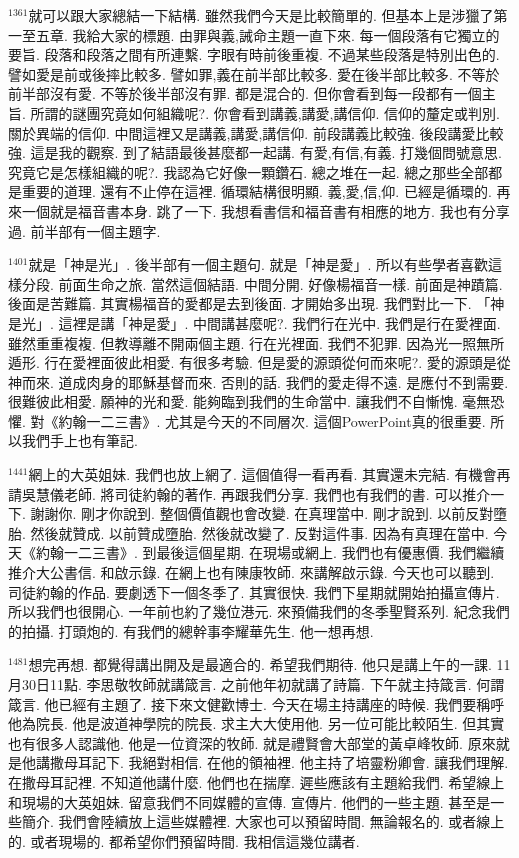 \documentclass{book}
\begin{document}
$^{1361}$就可以跟大家總結一下結構.
雖然我們今天是比較簡單的.
但基本上是涉獵了第一至五章.
我給大家的標題.
由罪與義,誡命主題一直下來.
每一個段落有它獨立的要旨.
段落和段落之間有所連繫.
字眼有時前後重複.
不過某些段落是特別出色的.
譬如愛是前或後摔比較多.
譬如罪,義在前半部比較多.
愛在後半部比較多.
不等於前半部沒有愛.
不等於後半部沒有罪.
都是混合的.
但你會看到每一段都有一個主旨.
所謂的謎團究竟如何組織呢?.
你會看到講義,講愛,講信仰.
信仰的釐定或判別.
關於異端的信仰.
中間這裡又是講義,講愛,講信仰.
前段講義比較強.
後段講愛比較強.
這是我的觀察.
到了結語最後甚麼都一起講.
有愛,有信,有義.
打幾個問號意思.
究竟它是怎樣組織的呢?.
我認為它好像一顆鑽石.
總之堆在一起.
總之那些全部都是重要的道理.
還有不止停在這裡.
循環結構很明顯.
義,愛,信,仰.
已經是循環的.
再來一個就是福音書本身.
跳了一下.
我想看書信和福音書有相應的地方.
我也有分享過.
前半部有一個主題字.

$^{1401}$就是「神是光」.
後半部有一個主題句.
就是「神是愛」.
所以有些學者喜歡這樣分段.
前面生命之旅.
當然這個結語.
中間分開.
好像楊福音一樣.
前面是神蹟篇.
後面是苦難篇.
其實楊福音的愛都是去到後面.
才開始多出現.
我們對比一下.
「神是光」.
這裡是講「神是愛」.
中間講甚麼呢?.
我們行在光中.
我們是行在愛裡面.
雖然重重複複.
但教導離不開兩個主題.
行在光裡面.
我們不犯罪.
因為光一照無所遁形.
行在愛裡面彼此相愛.
有很多考驗.
但是愛的源頭從何而來呢?.
愛的源頭是從神而來.
道成肉身的耶穌基督而來.
否則的話.
我們的愛走得不遠.
是應付不到需要.
很難彼此相愛.
願神的光和愛.
能夠臨到我們的生命當中.
讓我們不自慚愧.
毫無恐懼.
對《約翰一二三書》.
尤其是今天的不同層次.
這個PowerPoint真的很重要.
所以我們手上也有筆記.

$^{1441}$網上的大英姐妹.
我們也放上網了.
這個值得一看再看.
其實還未完結.
有機會再請吳慧儀老師.
將司徒約翰的著作.
再跟我們分享.
我們也有我們的書.
可以推介一下.
謝謝你.
剛才你說到.
整個價值觀也會改變.
在真理當中.
剛才說到.
以前反對墮胎.
然後就贊成.
以前贊成墮胎.
然後就改變了.
反對這件事.
因為有真理在當中.
今天《約翰一二三書》.
到最後這個星期.
在現場或網上.
我們也有優惠價.
我們繼續推介大公書信.
和啟示錄.
在網上也有陳康牧師.
來講解啟示錄.
今天也可以聽到.
司徒約翰的作品.
要劇透下一個冬季了.
其實很快.
我們下星期就開始拍攝宣傳片.
所以我們也很開心.
一年前也約了幾位港元.
來預備我們的冬季聖賢系列.
紀念我們的拍攝.
打頭炮的.
有我們的總幹事李耀華先生.
他一想再想.

$^{1481}$想完再想.
都覺得講出開及是最適合的.
希望我們期待.
他只是講上午的一課.
11月30日11點.
李思敬牧師就講箴言.
之前他年初就講了詩篇.
下午就主持箴言.
何謂箴言.
他已經有主題了.
接下來文健歡博士.
今天在場主持講座的時候.
我們要稱呼他為院長.
他是波道神學院的院長.
求主大大使用他.
另一位可能比較陌生.
但其實也有很多人認識他.
他是一位資深的牧師.
就是禮賢會大部堂的黃卓峰牧師.
原來就是他講撒母耳記下.
我絕對相信.
在他的領袖裡.
他主持了培靈粉卿會.
讓我們理解.
在撒母耳記裡.
不知道他講什麼.
他們也在揣摩.
遲些應該有主題給我們.
希望線上和現場的大英姐妹.
留意我們不同媒體的宣傳.
宣傳片.
他們的一些主題.
甚至是一些簡介.
我們會陸續放上這些媒體裡.
大家也可以預留時間.
無論報名的.
或者線上的.
或者現場的.
都希望你們預留時間.
我相信這幾位講者.
\end{document}
